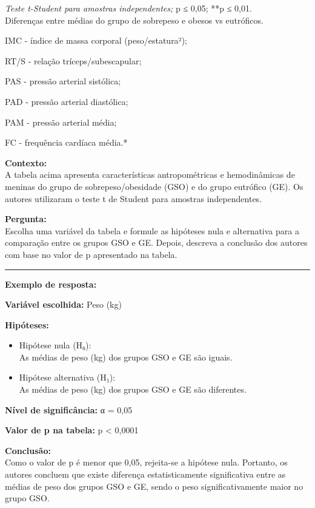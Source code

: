 \documentclass[
]{book}
\begin{document}
\emph{Teste t-Student para amostras independentes; }p ≤ 0,05; **p ≤ 0,01.\\
Diferenças entre médias do grupo de sobrepeso e obesos vs eutróficos.

IMC - índice de massa corporal (peso/estatura²);

RT/S - relação tríceps/subescapular;

PAS - pressão arterial sistólica;

PAD - pressão arterial diastólica;

PAM - pressão arterial média;

FC - frequência cardíaca média.*

\textbf{Contexto:}\\
A tabela acima apresenta características antropométricas e hemodinâmicas de meninas do grupo de sobrepeso/obesidade (GSO) e do grupo eutrófico (GE). Os autores utilizaram o teste t de Student para amostras independentes.

\textbf{Pergunta:}\\
Escolha uma variável da tabela e formule as hipóteses nula e alternativa para a comparação entre os grupos GSO e GE. Depois, descreva a conclusão dos autores com base no valor de p apresentado na tabela.

\begin{center}\rule{0.5\linewidth}{0.5pt}\end{center}

\textbf{Exemplo de resposta:}

\textbf{Variável escolhida:} Peso (kg)

\textbf{Hipóteses:}

\begin{itemize}
\item
  Hipótese nula (H₀):\\
  As médias de peso (kg) dos grupos GSO e GE são iguais.
\item
  Hipótese alternativa (H₁):\\
  As médias de peso (kg) dos grupos GSO e GE são diferentes.
\end{itemize}

\textbf{Nível de significância:} α = 0,05

\textbf{Valor de p na tabela:} p \textless{} 0,0001

\textbf{Conclusão:}\\
Como o valor de p é menor que 0,05, rejeita-se a hipótese nula. Portanto, os autores concluem que existe diferença estatisticamente significativa entre as médias de peso dos grupos GSO e GE, sendo o peso significativamente maior no grupo GSO.
\end{document}
